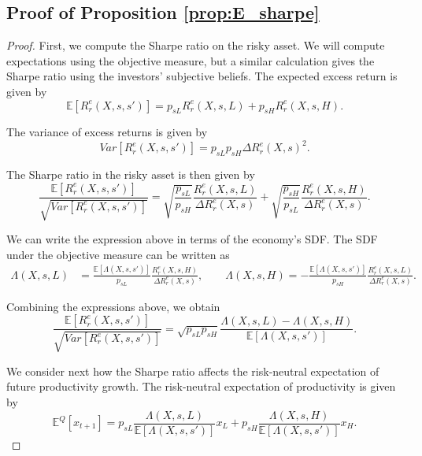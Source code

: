 \subsection{Proof of Proposition \ref{prop:E_sharpe}}\label{app: proof_E_sharpe}
\begin{proof}

First, we compute the Sharpe ratio on the risky asset. 
We will compute expectations using the objective measure, but a similar calculation gives the Sharpe ratio using the investors' subjective beliefs.
The expected excess return is given by
\begin{equation}
    \mathbb{E}\left[ R^e_r(X,s,s') \right] = p_{sL} R^e_r(X,s,L) + p_{sH} R^e_r(X,s,H).
\end{equation}

The variance of excess returns is given by
\begin{equation}
    Var[R^e_r(X,s,s')] = p_{sL} p_{sH} \Delta R^e_r(X,s)^2.
\end{equation}

The Sharpe ratio in the risky asset is then given by
\begin{equation}
    \frac{\mathbb{E}[R^e_r(X,s,s')]}{\sqrt{Var[R^e_r(X,s,s')]}} = \sqrt{\frac{p_{sL}}{p_{sH}}} \frac{R_r^e(X,s,L)}{\Delta R_r^e(X,s)} + \sqrt{\frac{p_{sH}}{p_{sL}}} \frac{R_r^e(X,s,H)}{\Delta R_r^e(X,s)}.
\end{equation}

We can write the expression above in terms of the economy's SDF.
The SDF under the objective measure can be written as
\begin{align}
    \Lambda(X,s,L) &= \frac{\mathbb{E}[\Lambda(X,s,s')]}{p_{sL}}  \frac{R_r^e(X,s,H)}{\Delta R_{r}^e(X,s)}, \qquad 
    \Lambda(X,s,H)  = -\frac{\mathbb{E}[\Lambda(X,s,s')]}{p_{sH}} \frac{R_r^e(X,s,L)}{\Delta R_{r}^e(X,s)}.
\end{align}

Combining the expressions above, we obtain
\begin{equation}
    \frac{\mathbb{E}[R^e_r(X,s,s')]}{\sqrt{Var[R^e_r(X,s,s')]}} = \sqrt{p_{sL} p_{sH}} \frac{\Lambda(X,s,L) - \Lambda(X,s,H)}{\mathbb{E}[\Lambda(X,s,s')]}.
\end{equation}

We consider next how the Sharpe ratio affects the risk-neutral expectation of future productivity growth.
The risk-neutral expectation of productivity is given by
\begin{equation}
    \mathbb{E}^Q\left[ x_{t+1} \right] = p_{sL} \frac{\Lambda(X,s,L)}{\mathbb{E}[\Lambda(X,s,s')]} x_L + p_{sH} \frac{\Lambda(X,s,H)}{\mathbb{E}[\Lambda(X,s,s')]} x_H.
\end{equation}


\end{proof}
